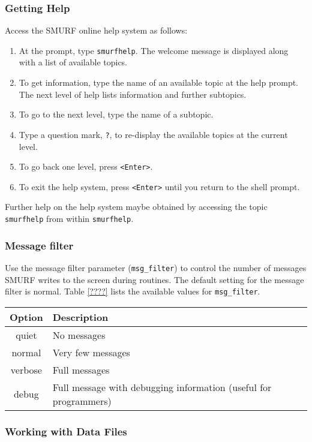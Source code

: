 \documentclass[twoside,11pt]{article}
\renewcommand{\_}{\texttt{\symbol{95}}}
\begin{document}
\subsubsection{Getting Help}

Access the SMURF online help system as follows:
\begin{enumerate}
\item At the prompt, type \verb-smurfhelp-. The welcome message is
  displayed along with a list of available topics.
\item To get information, type the name of an available topic at the
  help prompt.  The next level of help lists information and further
  subtopics.
\item To go to the next level, type the name of a subtopic.
\item Type a question mark, \verb-?-, to re-display the available
  topics at the current level.
\item To go back one level, press \verb-<Enter>-.
\item To exit the help system, press \verb-<Enter>- until you return
  to the shell prompt.
\end{enumerate}
Further help on the help system maybe obtained by accessing the topic
\verb-smurfhelp- from within \verb-smurfhelp-.

\subsubsection{Message filter}

Use the message filter parameter (\verb-msg_filter-) to control the
number of messages SMURF writes to the screen during routines. The
default setting for the message filter is normal. Table \ref{????}
lists the available values for \verb-msg_filter-.

\begin{table}
\begin{tabular}{|c|l|}
\hline
Option  & Description \\
\hline
quiet   & No messages \\
normal  & Very few messages \\
verbose & Full messages \\
debug   & Full message with debugging information (useful for programmers) \\
\hline
\end{tabular}
\end{table}

\subsubsection{Working with Data Files}
\end{document}
